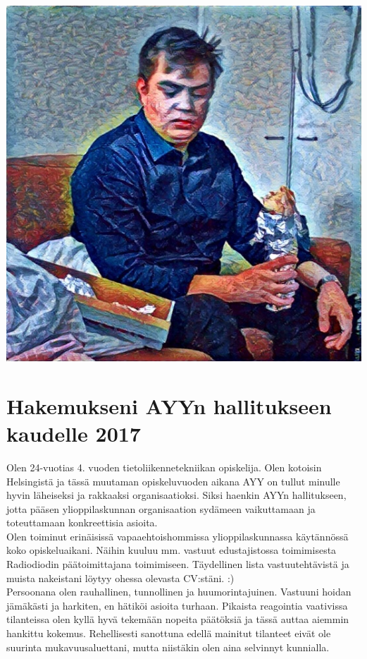 \documentclass[a4paper, 12pt, finnish]{report}
\newcommand{\topic}{Hakemukseni AYYn hallitukseen kaudelle 2017}
\begin{document}
\includegraphics{Onni.jpg}
\section*{\topic}

Olen 24-vuotias 4. vuoden tietoliikennetekniikan opiskelija.
Olen kotoisin Helsingistä ja tässä muutaman opiskeluvuoden aikana AYY on tullut minulle hyvin läheiseksi ja rakkaaksi organisaatioksi.
Siksi haenkin AYYn hallitukseen, jotta pääsen ylioppilaskunnan organisaation sydämeen vaikuttamaan ja toteuttamaan konkreettisia asioita.\\


Olen toiminut erinäisissä vapaaehtoishommissa ylioppilaskunnassa käytännössä koko opiskeluaikani.
Näihin kuuluu mm. vastuut edustajistossa toimimisesta Radiodiodin päätoimittajana toimimiseen.
Täydellinen lista vastuutehtävistä ja muista nakeistani löytyy ohessa olevasta CV:stäni. :)\\

Persoonana olen rauhallinen, tunnollinen ja huumorintajuinen.
Vastuuni hoidan jämäkästi ja harkiten, en hätiköi asioita turhaan.
Pikaista reagointia vaativissa tilanteissa olen kyllä hyvä tekemään nopeita päätöksiä ja tässä auttaa aiemmin hankittu kokemus.
Rehellisesti sanottuna edellä mainitut tilanteet eivät ole suurinta mukavuusaluettani, mutta niistäkin olen aina selvinnyt kunnialla.\\
\end{document}
